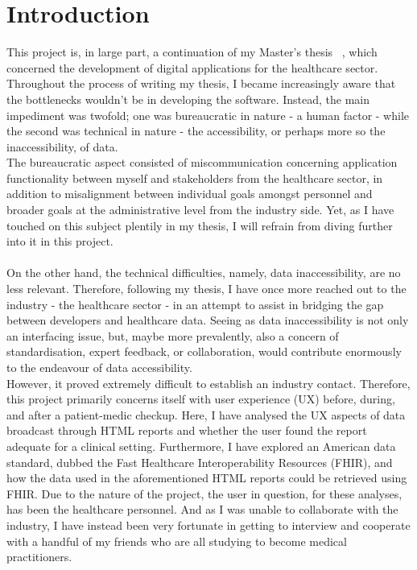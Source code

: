 \section{Introduction}
This project is, in large part, a continuation of my Master's thesis ~\cite{thesis}, which concerned the development of digital applications for the healthcare sector. Throughout the process of writing my thesis, I became increasingly aware that the bottlenecks wouldn't be in developing the software. Instead, the main impediment was twofold; one was bureaucratic in nature - a human factor - while the second was technical in nature - the accessibility, or perhaps more so the inaccessibility, of data.
\\
The bureaucratic aspect consisted of miscommunication concerning application functionality between myself and stakeholders from the healthcare sector, in addition to misalignment between individual goals amongst personnel and broader goals at the administrative level from the industry side. Yet, as I have touched on this subject plentily in my thesis, I will refrain from diving further into it in this project. 
\\
\\
On the other hand, the technical difficulties, namely, data inaccessibility, are no less relevant. Therefore, following my thesis, I have once more reached out to the industry - the healthcare sector - in an attempt to assist in bridging the gap between developers and healthcare data. Seeing as data inaccessibility is not only an interfacing issue, but, maybe more prevalently, also a concern of standardisation, expert feedback, or collaboration, would contribute enormously to the endeavour of data accessibility.
\\
However, it proved extremely difficult to establish an industry contact. Therefore, this project primarily concerns itself with user experience (UX) before, during, and after a patient-medic checkup. Here, I have analysed the UX aspects of data broadcast through HTML reports and whether the user found the report adequate for a clinical setting. Furthermore, I have explored an American data standard, dubbed the Fast Healthcare Interoperability Resources (FHIR), and how the data used in the aforementioned HTML reports could be retrieved using FHIR.
Due to the nature of the project, the user in question, for these analyses, has been the healthcare personnel. And as I was unable to collaborate with the industry, I have instead been very fortunate in getting to interview and cooperate with a handful of my friends who are all studying to become medical practitioners. 

